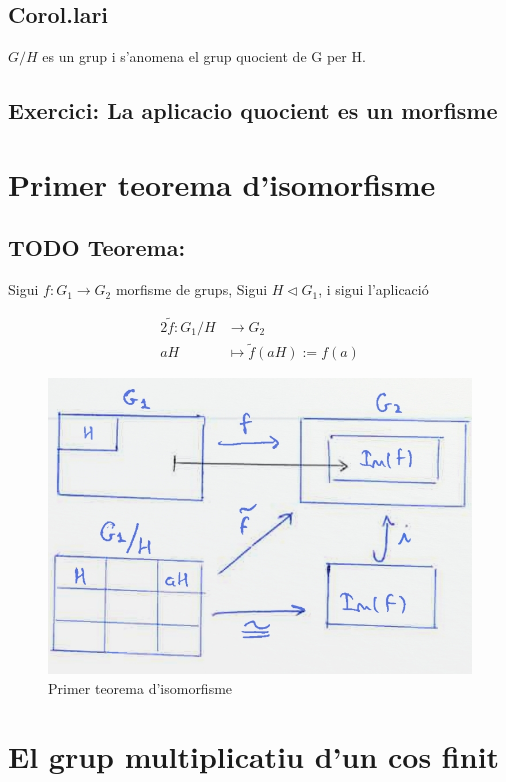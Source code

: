 \documentclass[11pt]{article}
\begin{document}
\subsection{Corol.lari}
\label{sec:org01a65fb}
\(G/H\) es un grup i s'anomena el grup quocient de G per H.
\subsection{Exercici: La aplicacio quocient es un morfisme}
\label{sec:org6aa000f}

\section{Primer teorema d'isomorfisme}
\label{sec:orgf4556b5}

\subsection{{\bfseries\sffamily TODO} Teorema:}
\label{sec:org4f685b4}
Sigui \(f: G_1 \to G_2\) morfisme de grups, Sigui \(H \vartriangleleft G_1\), i sigui l'aplicació

\begin{alignat*}{2}
\tilde{f}: G_1/H &\to G_2 \\
aH &\mapsto \tilde{f}(aH) := f(a)
\end{alignat*}
\begin{figure}[htbp]
\centering
\includegraphics[width=.9\linewidth]{./images/primeriso.jpg}
\caption{\label{fig:orgd18b264}
Primer teorema d'isomorfisme}
\end{figure}

\section{El grup multiplicatiu d'un cos finit}
\label{sec:org964d2ac}
\end{document}
